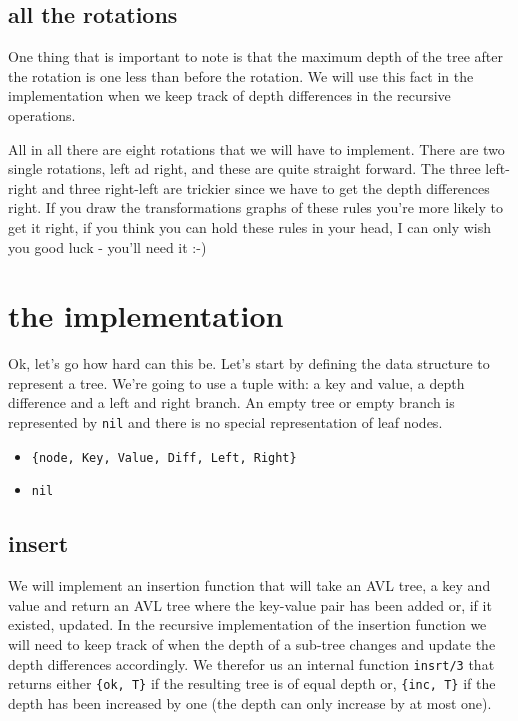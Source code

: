 \documentclass[a4paper,11pt]{article}
\begin{document}
\subsection{all the rotations}

One thing that is important to note is that the maximum depth of the
tree after the rotation is one less than before the rotation. We will
use this fact in the implementation when we keep track of depth
differences in the recursive operations.


All in all there are eight rotations that we will have to
implement. There are two single rotations, left ad right, and these
are quite straight forward. The three left-right and three right-left
are trickier since we have to get the depth differences right. If you
draw the transformations graphs of these rules you're more likely to
get it right, if you think you can hold these rules in your head, I
can only wish you good luck - you'll need it :-)

\section{the implementation}

Ok, let's go how hard can this be. Let's start by defining the
data structure to represent a tree. We're going to use a tuple with: a
key and value, a depth difference and a left and right branch. An
empty tree or empty branch is represented by {\tt nil} and there is
no special representation of leaf nodes.

\begin{itemize}
\item {\tt \{node, Key, Value, Diff, Left, Right\}}
\item {\tt nil}
\end{itemize}

\subsection{insert}

We will implement an insertion function that will take an AVL tree, a
key and value and return an AVL tree where the key-value pair has been
added or, if it existed, updated. In the recursive implementation of
the insertion function we will need to keep track of when the depth of
a sub-tree changes and update the depth differences accordingly. We
therefor us an internal function {\tt insrt/3} that returns either
{\tt\{ok, T\}} if the resulting tree is of equal depth or, {\tt \{inc,
  T\}} if the depth has been increased by one (the depth can only
increase by at most one).
\end{document}
